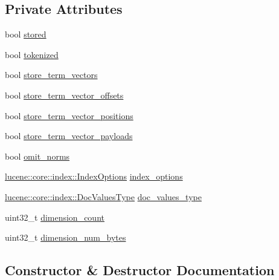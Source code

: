 \subsection*{Private Attributes}
\begin{DoxyCompactItemize}
\item 
bool \mbox{\hyperlink{classlucene_1_1core_1_1document_1_1FieldType_a56b81575dbaea749036201c379034cc8}{stored}}
\item 
bool \mbox{\hyperlink{classlucene_1_1core_1_1document_1_1FieldType_abe04c4af1aafbe73f3e1a0333f08cfd8}{tokenized}}
\item 
bool \mbox{\hyperlink{classlucene_1_1core_1_1document_1_1FieldType_af8c77a78e7e5749cbff0044ad5bc94b1}{store\+\_\+term\+\_\+vectors}}
\item 
bool \mbox{\hyperlink{classlucene_1_1core_1_1document_1_1FieldType_a8aae5a6917e9d3d02c00966df5169504}{store\+\_\+term\+\_\+vector\+\_\+offsets}}
\item 
bool \mbox{\hyperlink{classlucene_1_1core_1_1document_1_1FieldType_a0c763a29f6d5b3c9b29b585935332f90}{store\+\_\+term\+\_\+vector\+\_\+positions}}
\item 
bool \mbox{\hyperlink{classlucene_1_1core_1_1document_1_1FieldType_a7e6c868f2767a9045f55239448eb56fa}{store\+\_\+term\+\_\+vector\+\_\+payloads}}
\item 
bool \mbox{\hyperlink{classlucene_1_1core_1_1document_1_1FieldType_a608b14ab36f164f6fc88fc47401dfdd8}{omit\+\_\+norms}}
\item 
\mbox{\hyperlink{namespacelucene_1_1core_1_1index_a0d5e1f98471a76de106056cf3b5a7897}{lucene\+::core\+::index\+::\+Index\+Options}} \mbox{\hyperlink{classlucene_1_1core_1_1document_1_1FieldType_ace77c2df2db83441226f4c72e7455910}{index\+\_\+options}}
\item 
\mbox{\hyperlink{namespacelucene_1_1core_1_1index_a2f7ffaef6429b5df542c8aa12f8b9883}{lucene\+::core\+::index\+::\+Doc\+Values\+Type}} \mbox{\hyperlink{classlucene_1_1core_1_1document_1_1FieldType_ac90952580a0964ee3ca3c9a8c6fe65a9}{doc\+\_\+values\+\_\+type}}
\item 
uint32\+\_\+t \mbox{\hyperlink{classlucene_1_1core_1_1document_1_1FieldType_a86df8398e9e9765cda2d2e48c2ec8cce}{dimension\+\_\+count}}
\item 
uint32\+\_\+t \mbox{\hyperlink{classlucene_1_1core_1_1document_1_1FieldType_a66764229077763f23d13537795f7efe3}{dimension\+\_\+num\+\_\+bytes}}
\end{DoxyCompactItemize}


\subsection{Constructor \& Destructor Documentation}
\mbox{\label{classlucene_1_1core_1_1document_1_1FieldType_a8e7a413c31bb8225b7fef2acc596ee30}} 
